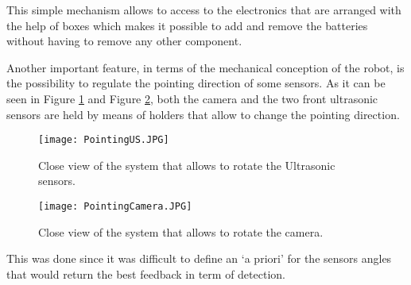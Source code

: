 This simple mechanism allows to access to the electronics that are arranged with the help of boxes which makes it possible to add and remove the batteries without having to remove any other component.

Another important feature, in terms of the mechanical conception of the robot, is the possibility to regulate the pointing direction of some sensors.
As it can be seen in Figure \ref{fig:PointingUS} and Figure \ref{fig:PointingCamera}, both the camera and the two front ultrasonic sensors are held by means of holders that allow to change the pointing direction.

\begin{figure}[H]
 \centering
 \texttt{[image: PointingUS.JPG]}
 \caption{Close view of the system that allows to rotate the Ultrasonic sensors.}
\label{fig:PointingUS}
\end{figure}

\begin{figure}[H]
 \centering
 \texttt{[image: PointingCamera.JPG]}
 \caption{Close view of the system that allows to rotate the camera.}
\label{fig:PointingCamera}
\end{figure}

This was done since it was difficult to define an `a priori' for the sensors angles  that would return the best feedback in term of detection.
